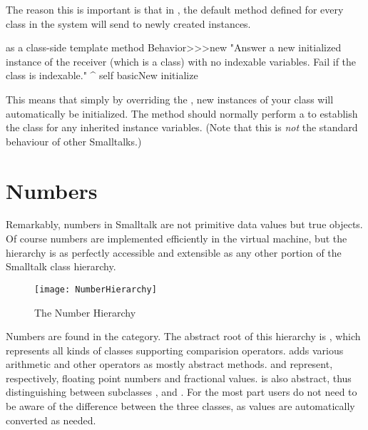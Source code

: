 \documentclass[a4paper,10pt,twoside]{book}
\begin{document}
The reason this is important is that in \pharo, the default  method defined for every class in the system will send  to newly created instances.

\begin{method}{ as a class-side template method}
Behavior>>>new
    "Answer a new initialized instance of the receiver (which is a class) with no indexable
    variables. Fail if the class is indexable."
    ^ self basicNew initialize
\end{method}

This means that simply by overriding the  , new instances of your class will automatically be initialized. The  method should normally perform a  to establish the class  for any inherited instance variables.
(Note that this is \emph{not} the standard behaviour of other Smalltalks.)

\section{Numbers}
Remarkably, numbers in Smalltalk are not primitive data values but true objects. Of course numbers are implemented efficiently in the virtual machine, but the  hierarchy is as perfectly accessible and extensible as any other portion of the Smalltalk class hierarchy.

\begin{figure}[ht]
\centerline {\texttt{[image: NumberHierarchy]}}
\caption{The Number Hierarchy }
\end{figure}

Numbers are found in the  category. The abstract root of this hierarchy is , which represents all kinds of classes supporting comparision operators.  adds various arithmetic and other operators as mostly abstract methods.  and  represent, respectively, floating point numbers and fractional values.   is also abstract, thus distinguishing between subclasses ,  and . For the most part users do not need to be aware of the difference between the three  classes, as values are automatically converted as needed.
\end{document}
